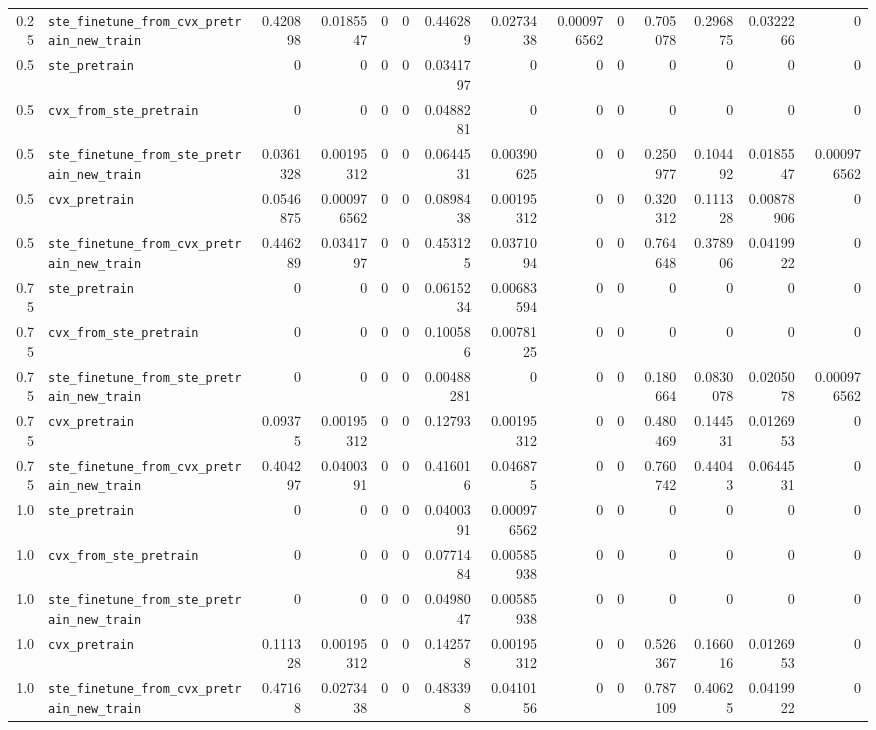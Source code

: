 \begin{longtable}{@{}r l *{12}{r}@{}}
0.25 & \texttt{ste\_finetune\_from\_cvx\_pretrain\_new\_train} & 0.420898 & 0.0185547 & 0 & 0 & 0.446289 & 0.0273438 & 0.000976562 & 0 & 0.705078 & 0.296875 & 0.0322266 & 0 \\
0.5 & \texttt{ste\_pretrain} & 0 & 0 & 0 & 0 & 0.0341797 & 0 & 0 & 0 & 0 & 0 & 0 & 0 \\
0.5 & \texttt{cvx\_from\_ste\_pretrain} & 0 & 0 & 0 & 0 & 0.0488281 & 0 & 0 & 0 & 0 & 0 & 0 & 0 \\
0.5 & \texttt{ste\_finetune\_from\_ste\_pretrain\_new\_train} & 0.0361328 & 0.00195312 & 0 & 0 & 0.0644531 & 0.00390625 & 0 & 0 & 0.250977 & 0.104492 & 0.0185547 & 0.000976562 \\
0.5 & \texttt{cvx\_pretrain} & 0.0546875 & 0.000976562 & 0 & 0 & 0.0898438 & 0.00195312 & 0 & 0 & 0.320312 & 0.111328 & 0.00878906 & 0 \\
0.5 & \texttt{ste\_finetune\_from\_cvx\_pretrain\_new\_train} & 0.446289 & 0.0341797 & 0 & 0 & 0.453125 & 0.0371094 & 0 & 0 & 0.764648 & 0.378906 & 0.0419922 & 0 \\
0.75 & \texttt{ste\_pretrain} & 0 & 0 & 0 & 0 & 0.0615234 & 0.00683594 & 0 & 0 & 0 & 0 & 0 & 0 \\
0.75 & \texttt{cvx\_from\_ste\_pretrain} & 0 & 0 & 0 & 0 & 0.100586 & 0.0078125 & 0 & 0 & 0 & 0 & 0 & 0 \\
0.75 & \texttt{ste\_finetune\_from\_ste\_pretrain\_new\_train} & 0 & 0 & 0 & 0 & 0.00488281 & 0 & 0 & 0 & 0.180664 & 0.0830078 & 0.0205078 & 0.000976562 \\
0.75 & \texttt{cvx\_pretrain} & 0.09375 & 0.00195312 & 0 & 0 & 0.12793 & 0.00195312 & 0 & 0 & 0.480469 & 0.144531 & 0.0126953 & 0 \\
0.75 & \texttt{ste\_finetune\_from\_cvx\_pretrain\_new\_train} & 0.404297 & 0.0400391 & 0 & 0 & 0.416016 & 0.046875 & 0 & 0 & 0.760742 & 0.44043 & 0.0644531 & 0 \\
1.0 & \texttt{ste\_pretrain} & 0 & 0 & 0 & 0 & 0.0400391 & 0.000976562 & 0 & 0 & 0 & 0 & 0 & 0 \\
1.0 & \texttt{cvx\_from\_ste\_pretrain} & 0 & 0 & 0 & 0 & 0.0771484 & 0.00585938 & 0 & 0 & 0 & 0 & 0 & 0 \\
1.0 & \texttt{ste\_finetune\_from\_ste\_pretrain\_new\_train} & 0 & 0 & 0 & 0 & 0.0498047 & 0.00585938 & 0 & 0 & 0 & 0 & 0 & 0 \\
1.0 & \texttt{cvx\_pretrain} & 0.111328 & 0.00195312 & 0 & 0 & 0.142578 & 0.00195312 & 0 & 0 & 0.526367 & 0.166016 & 0.0126953 & 0 \\
1.0 & \texttt{ste\_finetune\_from\_cvx\_pretrain\_new\_train} & 0.47168 & 0.0273438 & 0 & 0 & 0.483398 & 0.0410156 & 0 & 0 & 0.787109 & 0.40625 & 0.0419922 & 0 \\

\end{longtable}
